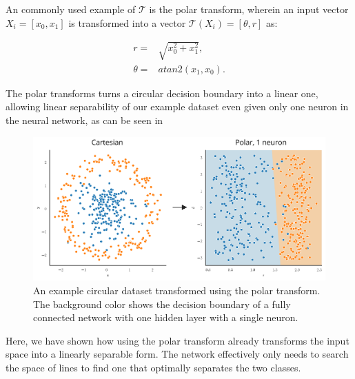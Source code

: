 An commonly used example of $\mathcal{T}$ is the polar transform, wherein an input vector $X_i = [x_0, x_1]$ is transformed into a vector $\mathcal{T}(X_i) = [\theta, r]$ as:

\begin{equation}
    \begin{aligned}
	r =& \sqrt{x_0^2 + x_1^2},\\
	\theta =& atan2(x_1, x_0).
    \end{aligned}
\end{equation}

The polar transforms turns a circular decision boundary into a linear one, allowing linear separability of our example dataset even given only one neuron in the neural network, as can be seen in 

	\begin{figure}[h]
		\centering
		\includegraphics[width=0.65\linewidth]{images/4/polar_dataset_neurons}
		\caption{An example circular dataset transformed using the polar transform. The background color shows the decision boundary of a fully connected network with one hidden layer with a single neuron.}
		\label{fig:polar_dataset_neurons}
	\end{figure}

Here, we have shown how using the polar transform already transforms the input space into a linearly separable form. The network effectively only needs to search the space of lines to find one that optimally separates the two classes.




